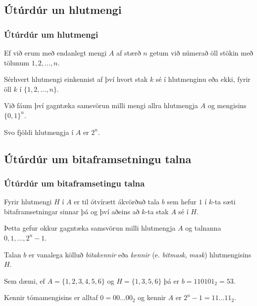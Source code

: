 \subsection{Útúrdúr un hlutmengi}
{
    \frametitle{Útúrdúr um hlutmengi}
    {
        \item<1-> Ef við erum með endanlegt mengi $A$ af stærð $n$ getum við númerað öll stökin með tölunum $1, 2, ..., n$.
        \item<2-> Sérhvert hlutmengi einkennist af því hvort stak $k$ sé í hlutmenginu eða ekki, fyrir öll $k$ í $\{1, 2, ..., n\}$.
        \item<3-> Við fáum því gagntæka samsvörun milli mengi allra hlutmengja $A$ og mengisins $\{0, 1\}^n$.
        \item<4-> Svo fjöldi hlutmengja í $A$ er $2^n$.
    }
}

\subsection{Útúrdúr um bitaframsetningu talna}
{
    \frametitle{Útúrdúr um bitaframsetingu talna}
    {
        \item<1-> Fyrir hlutmengi $H$ í $A$ er til ótvírætt ákvörðuð tala $b$ sem hefur $1$ í
            $k$-ta sæti bitaframsetningar sinnar þá og því aðeins að $k$-ta stak $A$ sé í $H$.
        \item<2-> Þetta gefur okkur gagntæka samsvörun milli hlutmengja $A$ og talnanna $0, 1, ..., 2^n - 1$.
        \item<3-> Talan $b$ er vanalega kölluð \emph{bitakennir} eða \emph{kennir} (e. \emph{bitmask}, \emph{mask}) hlutmengisins $H$.
        \item<4-> Sem dæmi, ef $A = \{1, 2, 3, 4, 5, 6\}$ og $H = \{1, 3, 5, 6\}$ þá er $b = 110101_2 = 53$.
        \item<5-> Kennir tómamengisins er alltaf $0 = 00\! \dots\! 00_2$ og kennir $A$ er $2^n - 1 = 11\! \dots\! 11_2$.
    }
}

